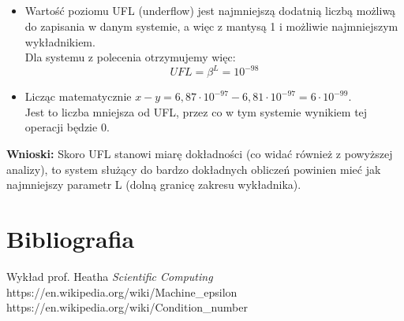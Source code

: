 \documentclass{article}
\begin{document}
\subsection{}
\begin{itemize}
    \item Wartość poziomu UFL (underflow) jest najmniejszą dodatnią liczbą możliwą do zapisania w danym systemie, a więc z mantysą 1 i możliwie najmniejszym wykładnikiem.\\
    Dla systemu z polecenia otrzymujemy więc:
    \[UFL = \beta^L = 10^{-98}\]
    \item Licząc matematycznie \(x - y = 6,87 \cdot 10^{-97} - 6,81 \cdot 10^{-97} = 6 \cdot 10^{-99}\).\\
    Jest to liczba mniejsza od UFL, przez co w tym systemie wynikiem tej operacji będzie 0.
\end{itemize}
\textbf{Wnioski:} Skoro UFL stanowi miarę dokładności (co widać również z powyższej analizy), to system służący do bardzo dokładnych obliczeń powinien mieć jak najmniejszy parametr L (dolną granicę zakresu wykładnika).

\section{Bibliografia}
Wykład prof. Heatha \textit{Scientific Computing}\\
https://en.wikipedia.org/wiki/Machine\_epsilon\\
https://en.wikipedia.org/wiki/Condition\_number
\end{document}
